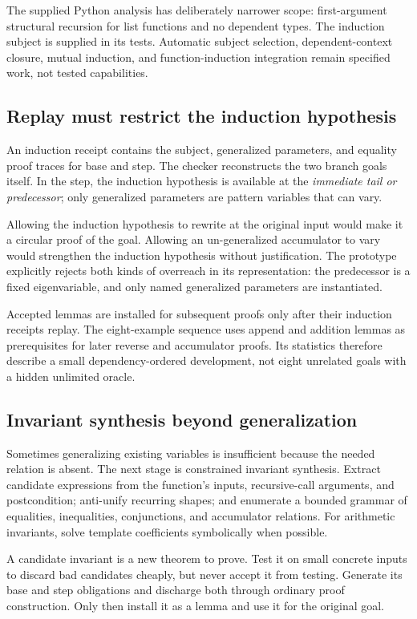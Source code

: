 \documentclass[11pt,letterpaper]{article}
\theoremstyle{definition}
\theoremstyle{remark}
\begin{document}
The supplied Python analysis has deliberately narrower scope: first-argument structural recursion for list functions and no dependent types. The induction subject is supplied in its tests. Automatic subject selection, dependent-context closure, mutual induction, and function-induction integration remain specified work, not tested capabilities.

\subsection{Replay must restrict the induction hypothesis}
An induction receipt contains the subject, generalized parameters, and equality proof traces for base and step. The checker reconstructs the two branch goals itself. In the step, the induction hypothesis is available at the \emph{immediate tail or predecessor}; only generalized parameters are pattern variables that can vary.

Allowing the induction hypothesis to rewrite at the original input would make it a circular proof of the goal. Allowing an un-generalized accumulator to vary would strengthen the induction hypothesis without justification. The prototype explicitly rejects both kinds of overreach in its representation: the predecessor is a fixed eigenvariable, and only named generalized parameters are instantiated.

Accepted lemmas are installed for subsequent proofs only after their induction receipts replay. The eight-example sequence uses append and addition lemmas as prerequisites for later reverse and accumulator proofs. Its statistics therefore describe a small dependency-ordered development, not eight unrelated goals with a hidden unlimited oracle.

\subsection{Invariant synthesis beyond generalization}
Sometimes generalizing existing variables is insufficient because the needed relation is absent. The next stage is constrained invariant synthesis. Extract candidate expressions from the function's inputs, recursive-call arguments, and postcondition; anti-unify recurring shapes; and enumerate a bounded grammar of equalities, inequalities, conjunctions, and accumulator relations. For arithmetic invariants, solve template coefficients symbolically when possible.

A candidate invariant is a new theorem to prove. Test it on small concrete inputs to discard bad candidates cheaply, but never accept it from testing. Generate its base and step obligations and discharge both through ordinary proof construction. Only then install it as a lemma and use it for the original goal.
\end{document}
